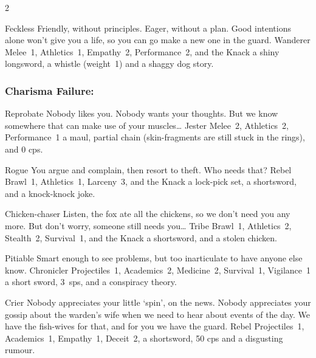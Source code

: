 \begin{multicols}{2}
\begin{itemize}
  {Feckless}%
  {Friendly, without principles.
  Eager, without a plan.
  Good intentions alone won't give you a life, so you can go make a new one in the \gls{guard}.
  }%
  {Wanderer}%
  {Melee~1, Athletics~1, Empathy~2, Performance~2, and the Knack \fasthealer}%
  {a shiny longsword, a whistle (\gls{weight}~1) and a shaggy dog story.}%

\end{itemize}

\needspace{10em}
\subsubsection{Charisma Failure:}

\begin{itemize}

  {Reprobate}%
  {Nobody likes you.
  Nobody wants your thoughts.
  But we know somewhere that can make use of your muscles\ldots
  }%
  {Jester}%
  {Melee~2, Athletics~2, Performance~1}%
  {a maul, partial chain (skin-fragments are still stuck in the rings), and 0 \glspl{cp}.}%

  {Rogue}%
  {You argue and complain, then resort to theft.
  Who needs that?
  }%
  {Rebel}%
  {Brawl~1, Athletics~1, Larceny~3, and the Knack \lucky}%
  {a lock-pick set, a shortsword, and a knock-knock joke.}%

  {Chicken-chaser}%
  {Listen, the fox ate all the chickens, so we don't need you any more.
  But don't worry, someone still needs you\ldots
  }%
  {Tribe}%
  {Brawl~1, Athletics~2, Stealth~2, Survival~1, and the Knack \lucky}%
  {a shortsword, and a stolen chicken.}%

  {Pitiable}%
  {Smart enough to see problems, but too inarticulate to have anyone else know.
  }%
  {Chronicler}%
  {Projectiles~1, Academics~2, Medicine~2, Survival~1, Vigilance~1}%
  {a short sword, 3~\glspl{sp}, and a conspiracy theory.}%

  {Crier}%
  {Nobody appreciates your little `spin', on the news.
  Nobody appreciates your gossip about the warden's wife when we need to hear about events of the day.
  We have the fish-wives for that, and for you we have the \gls{guard}.
  }%
  {Rebel}%
  {Projectiles~1, Academics~1, Empathy~1, Deceit~2, }%
  {a shortsword, 50 \glspl{cp} and a disgusting rumour.}%

\end{itemize}

\end{multicols}

